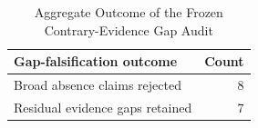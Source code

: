 \begin{table}[H]\centering\caption{Aggregate Outcome of the Frozen Contrary-Evidence Gap Audit}\label{tab:gapoutcomes}\scriptsize\begin{tabular}{lr}\toprule Gap-falsification outcome & Count\\\midrule Broad absence claims rejected & 8\\ Residual evidence gaps retained & 7\\\bottomrule\end{tabular}\end{table}
